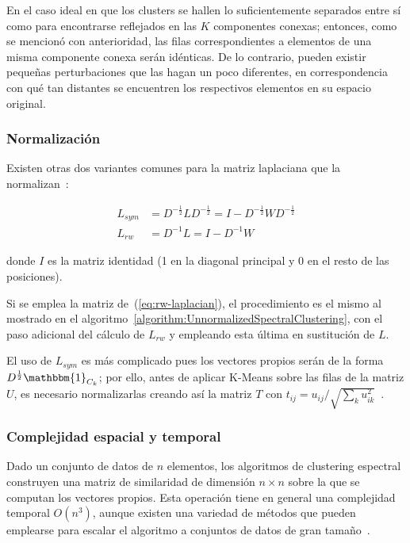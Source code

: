 En el caso ideal en que los clusters se hallen lo suficientemente separados entre sí como para encontrarse reflejados en las $K$ componentes conexas;
entonces, como se mencionó con anterioridad, las filas correspondientes a elementos de una misma componente conexa serán idénticas.
De lo contrario, pueden existir pequeñas perturbaciones que las hagan un poco diferentes, en correspondencia con qué tan distantes se encuentren los respectivos elementos en su espacio original.

\subsubsection{Normalización}

Existen otras dos variantes comunes para la matriz laplaciana que la normalizan~\cite{Aggarawal13}:

\begin{align}
    \label{eq:sym-laplacian}
    L_{sym} & = D^{-\frac{1}{2}}LD^{-\frac{1}{2}} = I - D^{-\frac{1}{2}} W D^{-\frac{1}{2}} \\
    \label{eq:rw-laplacian}
    L_{rw} & = D^{-1}L = I - D^{-1}W
\end{align}

\noindent donde $I$ es la matriz identidad (1 en la diagonal principal y 0 en el resto de las posiciones).

Si se emplea la matriz de~(\ref{eq:rw-laplacian}), el procedimiento es el mismo al mostrado en el algoritmo~\ref{algorithm:UnnormalizedSpectralClustering}, con el paso adicional del cálculo de $L_{rw}$ y empleando esta última en sustitución de $L$.

El uso de $L_{sym}$ es más complicado pues los vectores propios serán de la forma $D^{\frac{1}{2}}\mathbbm{1}_{C_k}$; por ello, antes de aplicar K-Means sobre las filas de la matriz $U$, es necesario normalizarlas creando así la matriz $T$ con $t_{ij} = u_{ij}/\sqrt{\sum_{k}{u_{ik}^2}}$~\cite{Murphy12}.

\subsubsection{Complejidad espacial y temporal}

Dado un conjunto de datos de $n$ elementos, los algoritmos de clustering espectral construyen una matriz de similaridad de dimensión $n \times n$ sobre la que se computan los vectores propios.
Esta operación tiene en general una complejidad temporal $O(n^3)$, aunque existen una variedad de métodos que pueden emplearse para escalar el algoritmo a conjuntos de datos de gran tamaño~\cite{Yan09}.

